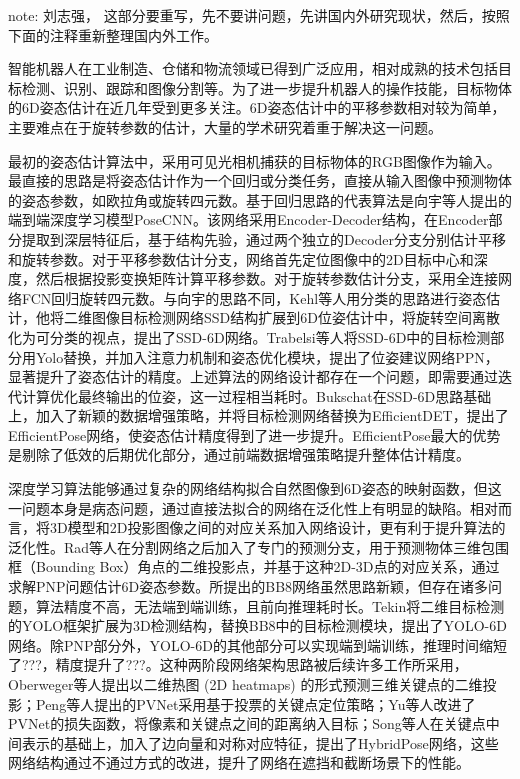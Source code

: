 \documentclass[12pt]{article}
\newcommand{\note}[1]{\textcolor[rgb]{0.6,0,0}{note: #1}}
\begin{document}
\note{刘志强， 这部分要重写，先不要讲问题，先讲国内外研究现状，然后，按照下面的注释重新整理国内外工作。}

智能机器人在工业制造、仓储和物流领域已得到广泛应用，相对成熟的技术包括目标检测、识别、跟踪和图像分割等。为了进一步提升机器人的操作技能，目标物体的6D姿态估计在近几年受到更多关注。6D姿态估计中的平移参数相对较为简单，主要难点在于旋转参数的估计，大量的学术研究着重于解决这一问题。

最初的姿态估计算法中，采用可见光相机捕获的目标物体的RGB图像作为输入。最直接的思路是将姿态估计作为一个回归或分类任务，直接从输入图像中预测物体的姿态参数，如欧拉角或旋转四元数。基于回归思路的代表算法是向宇等人提出的端到端深度学习模型PoseCNN\cite{Xiang2018}。该网络采用Encoder-Decoder结构，在Encoder部分提取到深层特征后，基于结构先验，通过两个独立的Decoder分支分别估计平移和旋转参数。对于平移参数估计分支，网络首先定位图像中的2D目标中心和深度，然后根据投影变换矩阵计算平移参数。对于旋转参数估计分支，采用全连接网络FCN回归旋转四元数。与向宇的思路不同，Kehl等人用分类的思路进行姿态估计，他将二维图像目标检测网络SSD\cite{liu2016ssd}结构扩展到6D位姿估计中，将旋转空间离散化为可分类的视点，提出了SSD-6D\cite{kehl2017ssd}网络。Trabelsi等人将SSD-6D中的目标检测部分用Yolo替换，并加入注意力机制和姿态优化模块，提出了位姿建议网络PPN\cite{trabelsi2021pose}，显著提升了姿态估计的精度。上述算法的网络设计都存在一个问题，即需要通过迭代计算优化最终输出的位姿，这一过程相当耗时。Bukschat在SSD-6D思路基础上，加入了新颖的数据增强策略，并将目标检测网络替换为EfficientDET\cite{tan2020efficientdet}，提出了EfficientPose\cite{bukschat2020efficientpose}网络，使姿态估计精度得到了进一步提升。EfficientPose最大的优势是剔除了低效的后期优化部分，通过前端数据增强策略提升整体估计精度。

深度学习算法能够通过复杂的网络结构拟合自然图像到6D姿态的映射函数，但这一问题本身是病态问题，通过直接法拟合的网络在泛化性上有明显的缺陷。相对而言，将3D模型和2D投影图像之间的对应关系加入网络设计，更有利于提升算法的泛化性。Rad等人在分割网络之后加入了专门的预测分支，用于预测物体三维包围框（Bounding Box）角点的二维投影点，并基于这种2D-3D点的对应关系，通过求解PNP问题估计6D姿态参数。所提出的BB8网络\cite{rad2017bb8}虽然思路新颖，但存在诸多问题，算法精度不高，无法端到端训练，且前向推理耗时长。Tekin将二维目标检测的YOLO\cite{redmon2016yolo}框架扩展为3D检测结构，替换BB8中的目标检测模块，提出了YOLO-6D网络。除PNP部分外，YOLO-6D的其他部分可以实现端到端训练，推理时间缩短了???，精度提升了???。这种两阶段网络架构思路被后续许多工作所采用，Oberweger等人\cite{oberweger2018}提出以二维热图 (2D heatmaps) 的形式预测三维关键点的二维投影；Peng等人\cite{peng2019pvnet}提出的PVNet采用基于投票的关键点定位策略；Yu等人\cite{yu20206dof}改进了PVNet的损失函数，将像素和关键点之间的距离纳入目标；Song等人在关键点中间表示的基础上，加入了边向量和对称对应特征，提出了HybridPose\cite{song2020hybridpose}网络，这些网络结构通过不通过方式的改进，提升了网络在遮挡和截断场景下的性能。
\end{document}
